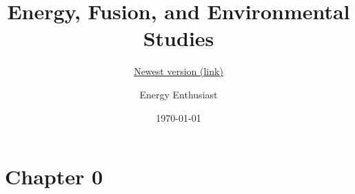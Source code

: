 \documentclass[a4paper, 11pt, nenglish, parskip=half-]{scrartcl}
\title{Energy, Fusion, and Environmental Studies}
\subtitle{\href{https://www.overleaf.com/read/kryhwydnvtnw}{\underline{Newest version (link)}}}
\date{\today}
\author{Energy Enthusiast}
\begin{document}
\maketitle
\newpage
\tableofcontents
\newpage

\section{Chapter 0}
\end{document}
